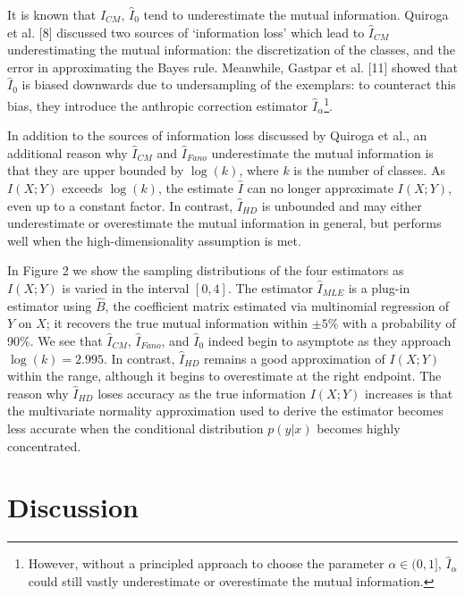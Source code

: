 \documentclass{article}
\begin{document}
It is known that $\hat{I}_{CM}$, $\hat{I}_0$ tend to underestimate the mutual information.
Quiroga et al. [8] discussed two sources of `information loss' which lead to $\hat{I}_{CM}$ underestimating the mutual information:
the discretization of the classes, and the error in approximating the Bayes rule.
Meanwhile, Gastpar et
al. [11] showed that $\hat{I}_0$ is biased downwards due to undersampling
of the exemplars: to counteract this bias, they introduce the
anthropic correction estimator $\hat{I}_\alpha$\footnote{However, without a
principled approach to choose the parameter $\alpha \in (0,1]$,
  $\hat{I}_\alpha$ could still vastly underestimate or overestimate
  the mutual information.}.

In addition to the sources of information loss discussed by Quiroga et al., an additional reason why $\hat{I}_{CM}$ and $\hat{I}_{Fano}$ underestimate the mutual information is that they are upper bounded by $\log(k)$, where $k$ is the number of classes.  As $I(X; Y)$ exceeds $\log(k)$,
the estimate $\hat{I}$ can no longer approximate $I(X; Y)$, even up to
a constant factor.  In contrast, $\hat{I}_{HD}$ is unbounded and 
may either underestimate or overestimate the mutual information in general,
but performs well when the high-dimensionality assumption is met.

In Figure 2 we show the sampling distributions of the four
estimators as $I(X; Y)$ is varied in the interval $[0, 4]$.  The estimator $\hat{I}_{MLE}$
is a plug-in estimator using $\hat{B}$, the coefficient matrix estimated via multinomial regression of $Y$ on $X$;
it recovers the true mutual information within $\pm 5\%$ with a probability of 90\%.
We see that $\hat{I}_{CM}$, $\hat{I}_{Fano}$, and $\hat{I}_0$ indeed begin to
asymptote as they approach $\log(k) = 2.995$.  In contrast,
$\hat{I}_{HD}$ remains a good approximation of $I(X; Y)$ within the
range, although it begins to overestimate at the right endpoint.  
The reason why $\hat{I}_{HD}$ loses accuracy as the true information $I(X; Y)$ increases is that
the multivariate normality approximation used to derive the estimator becomes less accurate when the conditional distribution 
$p(y|x)$ becomes highly concentrated.

\section{Discussion}
\end{document}
